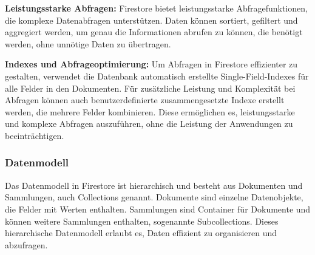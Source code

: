 \textbf{Leistungsstarke Abfragen:} Firestore bietet leistungsstarke Abfragefunktionen, die komplexe Datenabfragen unterstützen.
Daten können sortiert, gefiltert und aggregiert werden, um genau die Informationen abrufen zu können, die benötigt werden, ohne unnötige Daten zu übertragen.

\textbf{Indexes und Abfrageoptimierung:} Um Abfragen in Firestore effizienter zu gestalten, verwendet die Datenbank automatisch erstellte Single-Field-Indexes für alle Felder in den Dokumenten. Für zusätzliche Leistung und Komplexität bei Abfragen können auch benutzerdefinierte zusammengesetzte Indexe erstellt werden, die mehrere Felder kombinieren. Diese ermöglichen es, leistungsstarke und komplexe Abfragen auszuführen, ohne die Leistung der Anwendungen zu beeinträchtigen.


\subsubsection{Datenmodell}

Das Datenmodell\cite{firestore_datamodel} in Firestore ist hierarchisch und besteht aus Dokumenten und Sammlungen, auch Collections genannt. Dokumente sind einzelne Datenobjekte, die Felder mit Werten enthalten. Sammlungen sind Container für Dokumente und können weitere Sammlungen enthalten, sogenannte Subcollections. Dieses hierarchische Datenmodell erlaubt es, Daten effizient zu organisieren und abzufragen.




